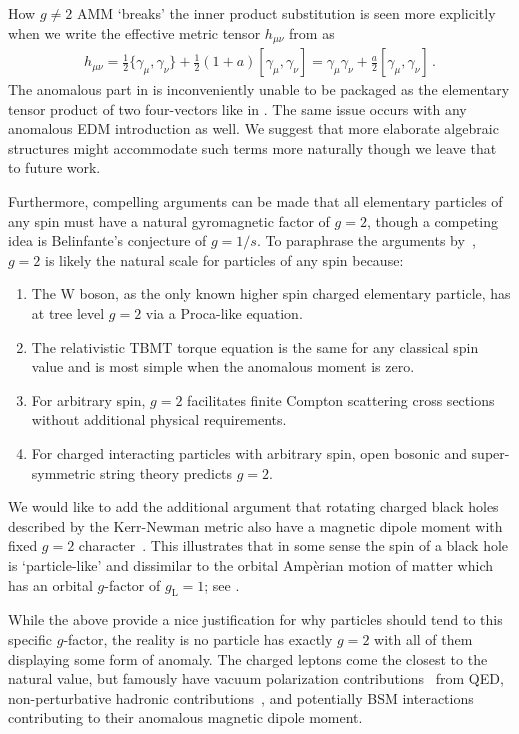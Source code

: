 How $g\!\neq\!2$ AMM `breaks' the inner product substitution is seen more explicitly when we write the effective metric tensor $h_{\mu\nu}$ from  as
\begin{gather}
    \label{spinstruc}
    h_{\mu\nu}=\frac{1}{2}\{\gamma_{\mu},\gamma_{\nu}\}+\frac{1}{2}(1+a)[\gamma_{\mu},\gamma_{\nu}]=\gamma_{\mu}\gamma_{\nu}+\frac{a}{2}[\gamma_{\mu},\gamma_{\nu}]\,.
\end{gather}
The anomalous part in  is inconveniently unable to be packaged as the elementary tensor product of two four-vectors like in . The same issue occurs with any anomalous EDM introduction as well. We suggest that more elaborate algebraic structures might accommodate such terms more naturally though we leave that to future work.

Furthermore, compelling arguments can be made that all elementary particles of any spin must have a natural gyromagnetic factor of $g\!=\!2$, though a competing idea is Belinfante's conjecture of $g\!=\!1/s$. To paraphrase the arguments by~\citet*{Ferrara:1992yc}, $g\!=\!2$ is likely the natural scale for particles of any spin because:
\begin{enumerate}[nosep]
	\item The W boson, as the only known higher spin charged elementary particle, has at tree level $g\!=\!2$ via a Proca-like equation.
	\item The relativistic TBMT torque equation is the same for any classical spin value and is most simple when the anomalous moment is zero.
	\item For arbitrary spin, $g\!=\!2$ facilitates finite Compton scattering cross sections without additional physical requirements.
	\item For charged interacting particles with arbitrary spin, open bosonic and super-symmetric string theory predicts $g\!=\!2$.
\end{enumerate}
We would like to add the additional argument that rotating charged black holes described by the Kerr-Newman metric also have a magnetic dipole moment with fixed $g\!=\!2$ character~\citep{Carter:1968rr}. This illustrates that in some sense the spin of a black hole is `particle-like' and dissimilar to the orbital Amp{\`e}rian motion of matter which has an orbital $g$-factor of $g_\mathrm{L}\!=\!1$; see .

While the above provide a nice justification for why particles should tend to this specific $g$-factor, the reality is no particle has exactly $g\!=\!2$ with all of them displaying some form of anomaly. The charged leptons come the closest to the natural value, but famously have vacuum polarization contributions~\citep{Schwinger:1951nm} from QED, non-perturbative hadronic contributions~\citep{Jegerlehner:2017gek}, and potentially BSM interactions~\citep{Knecht:2003kc} contributing to their anomalous magnetic dipole moment.

